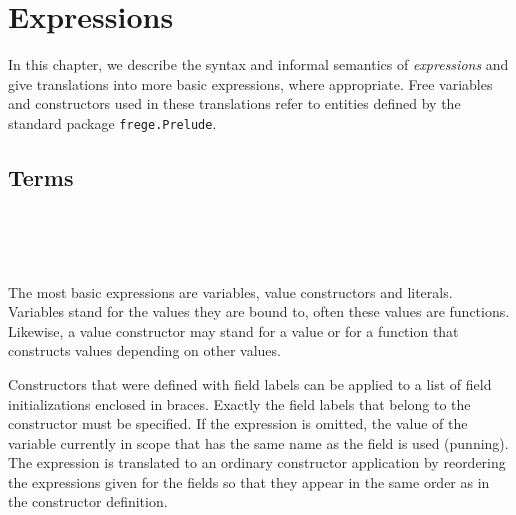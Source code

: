

\chapter{Expressions} \label{expressions} 

In this chapter, we describe the syntax and informal semantics of \frege{} \emph{expressions} and give translations into more basic expressions, where appropriate.
Free variables and constructors used in these translations refer to entities defined by the standard package \texttt{frege.Prelude}.

\section{Terms} 

\begin{flushleft}
  
  \alt{}   
  \alt{}   \sym{\{}  \sym{\}} 
  \alt{} 
  \alt{} \regex{\_} 
  \alt{} \sym{(}  \sym{)}
  \alt{} \sym{(}  \sym{)}
  \alt{} 
  \alt{} \sym{(} \sym{)} 
  \alt{}  
  \alt{}   \\
 \\
  \\
\end{flushleft}

The most basic expressions are variables, value constructors and literals.
Variables stand for the values they are bound to, often these values are functions.
Likewise, a value constructor may stand for a value or for a function that constructs values depending on other values.

Constructors that were defined with field labels can be applied to a list of field initializations enclosed in braces. Exactly the field labels that belong to the constructor must be specified. If the expression is omitted, the value of the variable currently in scope that has the same name as the field is used (punning). The expression is translated to an ordinary constructor application by reordering the expressions given for the fields so that they appear in the same order as in the constructor definition.

